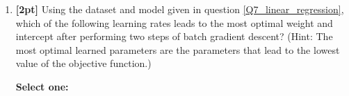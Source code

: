 \begin{enumerate}
    \begin{tcolorbox}[fit,height=1cm, width=4cm, blank, borderline={1pt}{-2pt},nobeforeafter]
    \end{tcolorbox}
    
    
    
    \item \textbf{[2pt]} Using the dataset and model given in question \ref{Q7_linear_regression}, which of the following learning rates leads to the most optimal weight and intercept after performing two steps of batch gradient descent? (Hint: The most optimal learned parameters are the parameters that lead to the lowest value of the objective function.)
    
    \textbf{Select one:}
    
    
    

    \clearpage
\end{enumerate}



